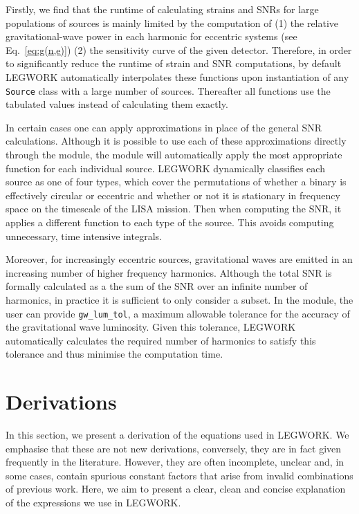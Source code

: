 \documentclass[twocolumn]{aastex631}
\newcommand{\lw}{LEGWORK}
\newcommand{\lwColour}{SeaGreen}
\newcommand{\lwModLink}[1]{\href{https://legwork.readthedocs.io/en/latest/modules.html\#module-legwork.#1}{\color{\lwColour}{\texttt{#1}}}}
\begin{document}
Firstly, we find that the runtime of calculating strains and SNRs for large populations of sources is mainly limited by the computation of (1) the relative gravitational-wave power in each harmonic for eccentric systems (see Eq.~\ref{eq:g(n,e)}) (2) the sensitivity curve of the given detector. Therefore, in order to significantly reduce the runtime of strain and SNR computations, by default \lw{} automatically interpolates these functions upon instantiation of any \texttt{Source} class with a large number of sources. Thereafter all functions use the tabulated values instead of calculating them exactly.

In certain cases one can apply approximations in place of the general SNR calculations. Although it is possible to use each of these approximations directly through the \lwModLink{snr} module, the \lwModLink{source} module will automatically apply the most appropriate function for each individual source. \lw{} dynamically classifies each source as one of four types, which cover the permutations of whether a binary is effectively circular or eccentric and whether or not it is stationary in frequency space on the timescale of the LISA mission. Then when computing the SNR, it applies a different function to each type of the source. This avoids computing unnecessary, time intensive integrals.

Moreover, for increasingly eccentric sources, gravitational waves are emitted in an increasing number of higher frequency harmonics. Although the total SNR is formally calculated as a the sum of the SNR over an infinite number of harmonics, in practice it is sufficient to only consider a subset. In the \lwModLink{source} module, the user can provide \texttt{gw\_lum\_tol}, a maximum allowable tolerance for the accuracy of the gravitational wave luminosity. Given this tolerance, \lw{} automatically calculates the required number of harmonics to satisfy this tolerance and thus minimise the computation time.

\section{Derivations}\label{sec:derivations}
In this section, we present a derivation of the equations used in \lw{}. We emphasise that these are not new derivations, conversely, they are in fact given frequently in the literature. However, they are often incomplete, unclear and, in some cases, contain spurious constant factors that arise from invalid combinations of previous work. Here, we aim to present a clear, clean and concise explanation of the expressions we use in \lw{}.
\end{document}
